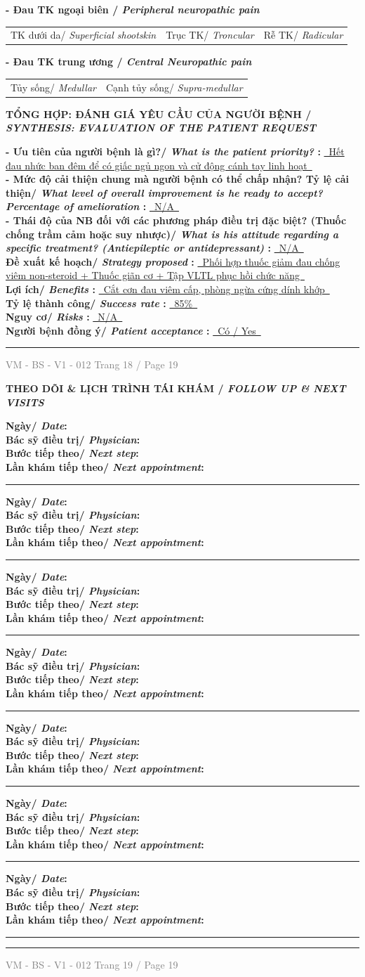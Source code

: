 \documentclass[11pt,a4paper]{article}
\newcommand{\CheckBox}[2][false]{%
    \ifthenelse{\equal{#1}{true}}{%
        \makebox[0pt][l]{$\square$}\raisebox{.15ex}{\hspace{0.08em}$\checkmark$}%
    }{%
        $\square$%
    }%
    \hspace{0.12cm}#2%
}
\newcommand{\SectionTitle}[2]{%
    \vspace{0.12cm}
    {\bfseries\large #1/ \textit{#2}}\par
    \vspace{0.06cm}
}
\newcommand{\SubSectionTitle}[2]{%
    \vspace{0.08cm}
    {\bfseries #1/ \textit{#2}}\par
}
\newcommand{\FormFooter}[2]{%
    \vfill
    \hrule
    \vspace{0.08cm}
    \noindent
    \small \textcolor{gray}{VM - BS - V1 - 012} \hfill \small \textcolor{gray}{Trang #1 / Page #2}
}
\newcommand{\FollowUpBlock}{%
    \noindent\textbf{Ngày/ \textit{Date}:} \dotfill\\[0.12cm]
    \noindent\textbf{Bác sỹ điều trị/ \textit{Physician}:} \dotfill\\[0.12cm]
    \noindent\textbf{Bước tiếp theo/ \textit{Next step}:} \dotfill\\[0.12cm]
    \noindent\textbf{Lần khám tiếp theo/ \textit{Next appointment}:} \dotfill\par
    \vspace{0.08cm}
    \hrule
    \vspace{0.12cm}
}
\begin{document}
\SubSectionTitle{ - Đau TK ngoại biên }{ Peripheral neuropathic pain }

\begin{tabularx}{\textwidth}{@{} X X X @{}}
    \CheckBox[false]{ TK dưới da/ \textit{ Superficial shootskin } }  &     \CheckBox[false]{ Trục TK/ \textit{ Troncular } }  &     \CheckBox[false]{ Rễ TK/ \textit{ Radicular } }   \\[0.12cm]
\end{tabularx}
\SubSectionTitle{ - Đau TK trung ương }{ Central Neuropathic pain }

\begin{tabularx}{\textwidth}{@{} X X @{}}
    \CheckBox[false]{ Tủy sống/ \textit{ Medullar } }  &     \CheckBox[false]{ Cạnh tủy sống/ \textit{ Supra-medullar } }   \\[0.12cm]
\end{tabularx}
\SubSectionTitle{ TỔNG HỢP: ĐÁNH GIÁ YÊU CẦU CỦA NGƯỜI BỆNH }{ SYNTHESIS: EVALUATION OF THE PATIENT REQUEST }

\textbf{ - Ưu tiên của người bệnh là gì?/ \textit{ What is the patient priority? }: } \underline{~Hết đau nhức ban đêm để có giấc ngủ ngon và cử động cánh tay linh hoạt~}\\[0.12cm]
\textbf{ - Mức độ cải thiện chung mà người bệnh có thể chấp nhận? Tỷ lệ cải thiện/ \textit{ What level of overall improvement is he ready to accept? Percentage of amelioration }: } \underline{~N/A~}\\[0.12cm]
\textbf{ - Thái độ của NB đối với các phương pháp điều trị đặc biệt? (Thuốc chống trầm cảm hoặc suy nhược)/ \textit{ What is his attitude regarding a specific treatment? (Antiepileptic or antidepressant) }: } \underline{~N/A~}\\[0.12cm]
\textbf{ Đề xuất kế hoạch/ \textit{ Strategy proposed }: } \underline{~Phối hợp thuốc giảm đau chống viêm non-steroid + Thuốc giãn cơ + Tập VLTL phục hồi chức năng~}\\[0.12cm]
\textbf{ Lợi ích/ \textit{ Benefits }: } \underline{~Cắt cơn đau viêm cấp, phòng ngừa cứng dính khớp~} ~~~~~ \textbf{ Tỷ lệ thành công/ \textit{ Success rate }: } \underline{~85\%~}\\[0.12cm]
\textbf{ Nguy cơ/ \textit{ Risks }: } \underline{~N/A~}\\[0.12cm]
\textbf{ Người bệnh đồng ý/ \textit{ Patient acceptance }: } \underline{~Có / Yes~}\\[0.12cm]


\FormFooter{ 18 }{ 19 }
\newpage

\SectionTitle{ THEO DÕI \& LỊCH TRÌNH TÁI KHÁM }{ FOLLOW UP \& NEXT VISITS }

\FollowUpBlock
\FollowUpBlock
\FollowUpBlock
\FollowUpBlock
\FollowUpBlock
\FollowUpBlock
\FollowUpBlock


\FormFooter{ 19 }{ 19 }
\end{document}
